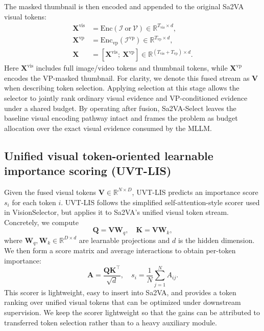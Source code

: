 The masked thumbnail is then encoded and appended to the original Sa2VA visual tokens:
\begin{equation}
\begin{aligned}
\mathbf{X}^{\mathrm{vis}} &= \mathrm{Enc}(\mathcal{I}\ \text{or}\ \mathcal{V}) \in \mathbb{R}^{T_{\mathrm{vis}}\times d},\\
\mathbf{X}^{\mathrm{vp}} &= \mathrm{Enc}_{\mathrm{vp}}(\mathcal{I}^{\mathrm{vp}}) \in \mathbb{R}^{T_{\mathrm{vp}}\times d},\\
\mathbf{X} &= [\mathbf{X}^{\mathrm{vis}};\ \mathbf{X}^{\mathrm{vp}}] \in \mathbb{R}^{(T_{\mathrm{vis}}+T_{\mathrm{vp}})\times d}.
\end{aligned}
\label{eq:method_unified_tokens}
\end{equation}
Here $\mathbf{X}^{\mathrm{vis}}$ includes full image/video tokens and thumbnail tokens, while $\mathbf{X}^{\mathrm{vp}}$ encodes the VP-masked thumbnail.
For clarity, we denote this fused stream as $\mathbf{V}$ when describing token selection.
Applying selection at this stage allows the selector to jointly rank ordinary visual evidence and VP-conditioned evidence under a shared budget.
By operating after fusion, Sa2VA-Select leaves the baseline visual encoding pathway intact and frames the problem as budget allocation over the exact visual evidence consumed by the MLLM.

\subsection{Unified visual token-oriented learnable importance scoring (UVT-LIS)}
\label{sec:method_lis}
Given the fused visual tokens $\mathbf{V}\in\mathbb{R}^{N\times D}$, UVT-LIS predicts an importance score $s_i$ for each token $i$.
UVT-LIS follows the simplified self-attention-style scorer used in VisionSelector, but applies it to Sa2VA's unified visual token stream. Concretely, we compute
\begin{equation}
\mathbf{Q}=\mathbf{V}\mathbf{W}_{q},\quad \mathbf{K}=\mathbf{V}\mathbf{W}_{k},
\label{eq:method_lis_qk}
\end{equation}
where $\mathbf{W}_{q},\mathbf{W}_{k}\in\mathbb{R}^{D\times d}$ are learnable projections and $d$ is the hidden dimension.
We then form a score matrix and average interactions to obtain per-token importance:
\begin{equation}
\mathbf{A}=\frac{\mathbf{Q}\mathbf{K}^{\top}}{\sqrt{d}},\quad s_i=\frac{1}{N}\sum_{j=1}^{N}A_{ij}.
\label{eq:method_lis_score}
\end{equation}
This scorer is lightweight, easy to insert into Sa2VA, and provides a token ranking over unified visual tokens that can be optimized under downstream supervision.
We keep the scorer lightweight so that the gains can be attributed to transferred token selection rather than to a heavy auxiliary module.

